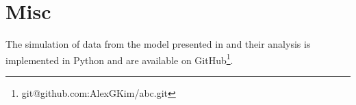 \documentclass[preprint,3p]{elsarticle}
\begin{document}
\section{Misc}
The simulation of data from the model presented in
and their analysis is implemented in Python and are available
on GitHub\footnote{{git@github.com:AlexGKim/abc.git}}.

%
%
\end{document}
